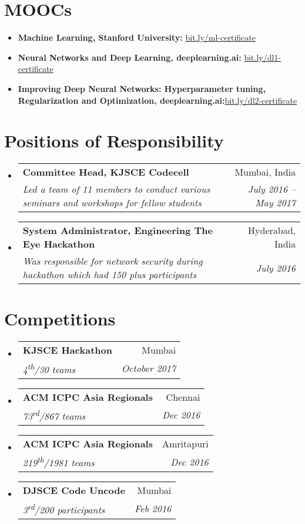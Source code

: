 \documentclass[letterpaper,8pt]{article}
\makeatletter
\newcommand{\resumeSubheading}[4]{
  \vspace{-1pt}\item
    \begin{tabular*}{0.97\textwidth}{l@{\extracolsep{\fill}}r}
      \textbf{#1} & #2 \\
      \textit{\small#3} & \textit{\small #4} \\
    \end{tabular*}\vspace{-5pt}
}
\newcommand{\resumeSubHeadingListStart}{\begin{itemize}[leftmargin=*]}
\newcommand{\resumeSubHeadingListEnd}{\end{itemize}}
\makeatother
\begin{document}
\section{MOOCs}
  \resumeSubHeadingListStart
    \item{
      \textbf{Machine Learning, Stanford University:}{ \href{http://bit.ly/ml-certificate}{bit.ly/ml-certificate}}
      \hfill
    }
    \vspace{-4pt}
    \item{
      \textbf{Neural Networks and Deep Learning, deeplearning.ai:}{ \href{http://bit.ly/dl1-certificate}{bit.ly/dl1-certificate}}
      \hfill
    }
    \vspace{-4pt}
    \item{
      \textbf{Improving Deep Neural Networks: Hyperparameter tuning, Regularization and Optimization, deeplearning.ai:}{\href{http://bit.ly/dl2-certificate}{bit.ly/dl2-certificate}}
      \hfill
    }
  \resumeSubHeadingListEnd
\section{Positions of Responsibility}
  \resumeSubHeadingListStart
    \resumeSubheading
      {Committee Head, KJSCE Codecell}{Mumbai, India}
      {Led a team of 11 members to conduct various seminars and workshops for fellow students}{July 2016 -- May 2017}
    \resumeSubheading
      {System Administrator, Engineering The Eye Hackathon}{Hyderabad, India}
      {Was responsible for network security during hackathon which had 150 plus participants}{July 2016}
  \resumeSubHeadingListEnd
  
\section{Competitions}
  \resumeSubHeadingListStart
  	\resumeSubheading{KJSCE Hackathon}{Mumbai}{4\textsuperscript{th}/30 teams}{October 2017}
    \resumeSubheading{ACM ICPC Asia Regionals}{Chennai}{73\textsuperscript{rd}/867 teams}{Dec 2016}
    \resumeSubheading{ACM ICPC Asia Regionals}{Amritapuri}{219\textsuperscript{th}/1981 teams}{Dec 2016}
    \resumeSubheading{DJSCE Code Uncode}{Mumbai}{3\textsuperscript{rd}/200 participants}{Feb 2016}
  \resumeSubHeadingListEnd

\end{document}
